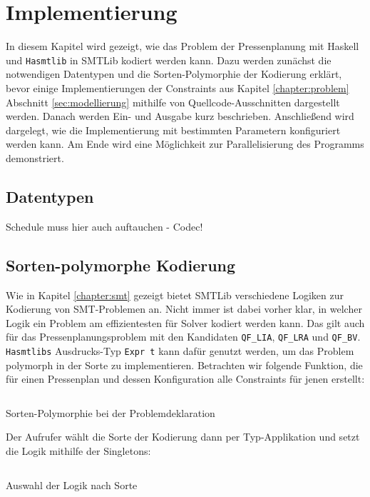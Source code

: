 \chapter{Implementierung}
\label{chapter:implementierung}
In diesem Kapitel wird gezeigt, wie das Problem der Pressenplanung mit Haskell und \texttt{Hasmtlib} in SMTLib kodiert werden kann.
Dazu werden zunächst die notwendigen Datentypen und die Sorten-Polymorphie der Kodierung erklärt, bevor einige Implementierungen der Constraints aus
Kapitel \ref{chapter:problem} Abschnitt \ref{sec:modellierung} mithilfe von Quellcode-Ausschnitten dargestellt werden.
Danach werden Ein- und Ausgabe kurz beschrieben.
Anschließend wird dargelegt, wie die Implementierung mit bestimmten Parametern konfiguriert werden kann.
Am Ende wird eine Möglichkeit zur Parallelisierung des Programms demonstriert.

\section{Datentypen}
Schedule muss hier auch auftauchen - Codec!

\section{Sorten-polymorphe Kodierung}
Wie in Kapitel \ref{chapter:smt} gezeigt bietet SMTLib verschiedene Logiken zur Kodierung von SMT-Problemen an.
Nicht immer ist dabei vorher klar, in welcher Logik ein Problem am effizientesten für Solver kodiert werden kann.
Das gilt auch für das Pressenplanungsproblem mit den Kandidaten \texttt{QF\_LIA}, \texttt{QF\_LRA} und \texttt{QF\_BV}.
\texttt{Hasmtlibs} Ausdrucks-Typ \texttt{Expr t} kann dafür genutzt werden, um das Problem polymorph in der Sorte zu implementieren.
Betrachten wir folgende Funktion, die für einen Pressenplan und dessen Konfiguration alle Constraints für jenen erstellt:

\begin{listing}[H]
    \inputminted[linenos=true]{haskell}{Code/Implementierung/SortPoly.hs}
    \caption{Sorten-Polymorphie bei der Problemdeklaration}
    \label{listing:implsortpoly}
\end{listing}

Der Aufrufer wählt die Sorte der Kodierung dann per Typ-Applikation und setzt die Logik mithilfe der Singletons:

\begin{listing}[H]
    \inputminted[linenos=true]{haskell}{Code/Implementierung/SortPolySetLogic.hs}
    \caption{Auswahl der Logik nach Sorte}
    \label{listing:implsortpolylogic}
\end{listing}

